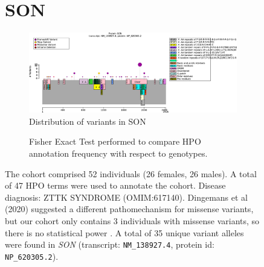 \begin{figure}[htbp]
\section*{SON}
\centering
\begin{subfigure}[b]{0.95\textwidth}
\centering
\includegraphics[width=\textwidth]{img/SON_protein_diagram.pdf} 
\captionsetup{justification=raggedright,singlelinecheck=false}
\caption{Distribution of variants in SON}
\end{subfigure}

\vspace{2em}

\begin{subfigure}[b]{0.95\textwidth}
\centering
{}
\captionsetup{justification=raggedright,singlelinecheck=false}
\caption{Fisher Exact Test performed to compare HPO annotation frequency with respect to genotypes.}
\end{subfigure}

\vspace{2em}

\caption{ The cohort comprised 52 individuals (26 females, 26 males). A total of 47 HPO terms were used to annotate the cohort. 
Disease diagnosis: ZTTK SYNDROME (OMIM:617140). Dingemans et al (2020) suggested a different pathomechanism for missense variants, 
but our cohort only contains 3 individuals with missense variants, so there is no statistical power \cite{PMID_34521999}. 
A total of 35 unique variant alleles were found in \textit{SON} (transcript: \texttt{NM\_138927.4}, protein id: \texttt{NP\_620305.2}).}
\end{figure}
